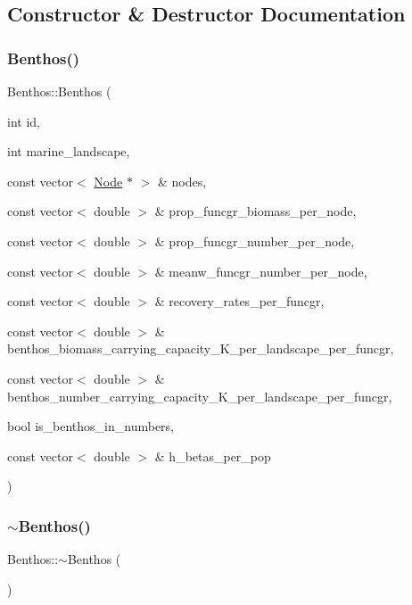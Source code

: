 \subsection{Constructor \& Destructor Documentation}
\mbox{\label{class_benthos_a5030be8685944dc189b9980fb9fa3ae6}} 
\subsubsection{\texorpdfstring{Benthos()}{Benthos()}\hspace{0.1cm}{\footnotesize\ttfamily [1/2]}}
{\footnotesize\ttfamily Benthos\+::\+Benthos (\begin{DoxyParamCaption}\item[{int}]{id,  }\item[{int}]{marine\+\_\+landscape,  }\item[{const vector$<$ \mbox{\hyperlink{class_node}{Node}} $\ast$ $>$ \&}]{nodes,  }\item[{const vector$<$ double $>$ \&}]{prop\+\_\+funcgr\+\_\+biomass\+\_\+per\+\_\+node,  }\item[{const vector$<$ double $>$ \&}]{prop\+\_\+funcgr\+\_\+number\+\_\+per\+\_\+node,  }\item[{const vector$<$ double $>$ \&}]{meanw\+\_\+funcgr\+\_\+number\+\_\+per\+\_\+node,  }\item[{const vector$<$ double $>$ \&}]{recovery\+\_\+rates\+\_\+per\+\_\+funcgr,  }\item[{const vector$<$ double $>$ \&}]{benthos\+\_\+biomass\+\_\+carrying\+\_\+capacity\+\_\+\+K\+\_\+per\+\_\+landscape\+\_\+per\+\_\+funcgr,  }\item[{const vector$<$ double $>$ \&}]{benthos\+\_\+number\+\_\+carrying\+\_\+capacity\+\_\+\+K\+\_\+per\+\_\+landscape\+\_\+per\+\_\+funcgr,  }\item[{bool}]{is\+\_\+benthos\+\_\+in\+\_\+numbers,  }\item[{const vector$<$ double $>$ \&}]{h\+\_\+betas\+\_\+per\+\_\+pop }\end{DoxyParamCaption})}

\mbox{\label{class_benthos_a172b056d9a8a28735649d66a0d86b2f8}} 
\subsubsection{\texorpdfstring{$\sim$Benthos()}{~Benthos()}}
{\footnotesize\ttfamily Benthos\+::$\sim$\+Benthos (\begin{DoxyParamCaption}{ }\end{DoxyParamCaption})\hspace{0.3cm}{\ttfamily [virtual]}}

